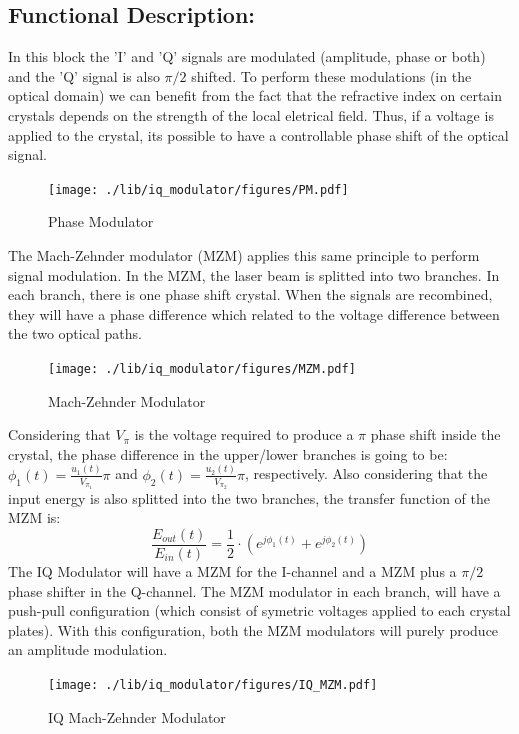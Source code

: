 \subsection*{Functional Description:}

In this block the 'I' and 'Q' signals are modulated (amplitude, phase or both) and the 'Q' signal is also $\pi/2$ shifted.
To perform these modulations (in the optical domain) we can benefit from the fact that the refractive index on certain crystals depends on the strength of the local eletrical field.
Thus, if a voltage is applied to the crystal, its possible to have a controllable phase shift of the optical signal.
\begin{figure}[H]
	\centering
	\texttt{[image: ./lib/iq\_modulator/figures/PM.pdf]}
	\label{Phase_Modulator}\caption{Phase Modulator}
\end{figure}
The Mach-Zehnder modulator (MZM) applies this same principle to perform signal modulation.
In the MZM, the laser beam is splitted into two branches. In each branch, there is one phase shift crystal. When the signals are recombined, they will have a phase difference which related to the voltage difference between the two optical paths.
\begin{figure}[H]
	\centering
	\texttt{[image: ./lib/iq\_modulator/figures/MZM.pdf]}
	\label{MZM}\caption{Mach-Zehnder Modulator}
\end{figure}
Considering that $V_{\pi}$ is the voltage required to produce a $\pi$ phase shift inside the crystal, the phase difference in the upper/lower branches is going to be: $\phi_{1}(t)=\frac{u_{1}(t)}{V_{\pi_{1}}} \pi$ and  $\phi_{2}(t)=\frac{u_{2}(t)}{V_{\pi_{2}}} \pi$, respectively.
Also considering that the input energy is also splitted into the two branches, the transfer function of the MZM is:
\begin{equation}
\dfrac{E_{out}(t)}{E_{in}(t)} = \frac{1}{2}\cdot(e^{j\phi_{1}(t)}+e^{j\phi_{2}(t)})
\label{MZM_TF}
\end{equation}
The IQ Modulator will have a MZM for the I-channel and a MZM plus a $\pi/2$ phase shifter in the Q-channel.
The MZM modulator in each branch, will have a push-pull configuration (which consist of symetric voltages applied to each crystal plates). With this configuration, both the MZM modulators will purely produce an amplitude modulation.
\begin{figure}[H]
	\centering
	\texttt{[image: ./lib/iq\_modulator/figures/IQ\_MZM.pdf]}
	\label{IQ_Mach-Zehnder_Modulator}\caption{IQ Mach-Zehnder Modulator}
\end{figure}
